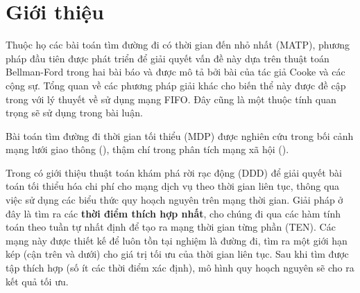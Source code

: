 \documentclass[../main.tex]{subfiles}
\begin{document}
\chapter{Giới thiệu}\label{introduce}


Thuộc họ các bài toán tìm đường đi có thời gian đến nhỏ nhất (MATP), phương pháp đầu
tiên được phát triển để giải quyết vấn đề này dựa trên thuật toán
Bellman-Ford trong hai bài báo \cite{bellman1958routing,ford2010flows} và được mô tả bởi
bài \cite{cooke1966shortest} của tác giả Cooke và các cộng sự. Tổng quan về các phương pháp giải khác cho biến thể
này được đề cập trong \cite{dean2004shortest} với lý thuyết về sử dụng mạng FIFO. Đây cũng là một thuộc tính quan trọng sẽ sử dụng trong bài luận.

Bài toán tìm đường đi thời gian tối thiểu (MDP) được nghiên cứu trong bối cảnh mạng lưới giao thông (\cite{demiryurek2011online}), thậm chí trong phân tích mạng xã hội (\cite{gunturi2012information}).

Trong \cite{boland2017continuous} có giới thiệu thuật toán khám phá rời rạc động (DDD) để giải quyết bài
toán tối thiểu hóa chi phí cho mạng dịch vụ theo thời gian liên tục,
thông qua việc sử dụng các biểu thức quy hoạch nguyên trên mạng thời
gian. Giải pháp ở đây là tìm ra các \textbf{thời điểm thích hợp nhất},
cho chúng đi qua các hàm tính toán theo tuần tự nhất định để tạo ra mạng
thời gian từng phần (TEN). Các mạng này được thiết kế để luôn tồn tại nghiệm là đường đi, tìm
ra một giới hạn kép (cận trên và dưới) cho giá trị tối ưu của thời gian
liên tục. Sau khi tìm được tập thích hợp (số ít các thời điểm xác định), mô hình
quy hoạch nguyên sẽ cho ra kết quả tối ưu.


\end{document}
